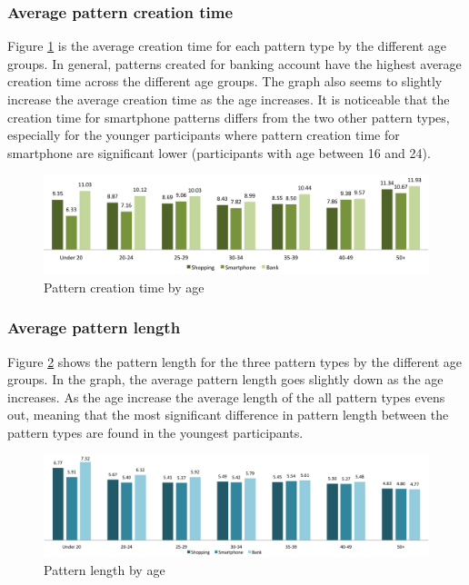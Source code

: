     \subsubsection{Average pattern creation time}
    Figure \ref{fig:patterncreationtimeage} is the average creation time for each pattern type by the different age groups. In general, patterns created for banking account have the highest average creation time across the different age groups. The graph also seems to slightly increase the average creation time as the age increases. It is noticeable that the creation time for smartphone patterns differs from the two other pattern types, especially for the younger participants where pattern creation time for smartphone are significant lower (participants with age between 16 and 24).

    \begin{figure}[H]
      \centering
      \includegraphics[width=\textwidth]{pics/analysis/creationtime-age.png}
      \caption{Pattern creation time by age}
      \label{fig:patterncreationtimeage}
    \end{figure}

    \clearpage
    \subsubsection{Average pattern length}
    Figure \ref{fig:patternlengthage} shows the pattern length for the three pattern types by the different age groups. In the graph, the average pattern length goes slightly down as the age increases. As the age increase the average length of the all pattern types evens out, meaning that the most significant difference in pattern length between the pattern types are found in the youngest participants.

  	\begin{figure}[H]
	    \centering
	    \includegraphics[width=\textwidth]{pics/analysis/avgpatternlength-age.png}
	    \caption{Pattern length by age}
	    \label{fig:patternlengthage}
  	\end{figure}

